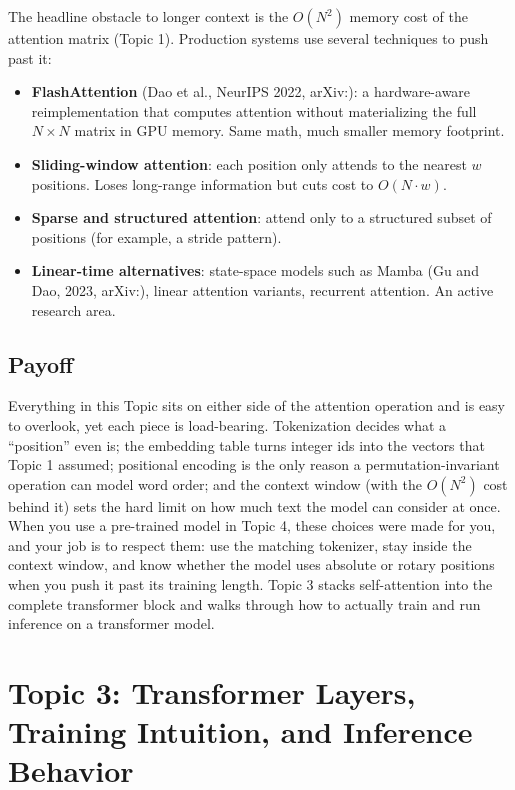 \documentclass[11pt]{article}
\theoremstyle{remark}
\newcommand{\arxiv}[1]{arXiv:\allowbreak #1}
\begin{document}
The headline obstacle to longer context is the \(O(N^2)\) memory cost of the attention matrix (Topic 1). Production systems use several techniques to push past it:
\begin{itemize}[noitemsep]
    \item \textbf{FlashAttention} (Dao et al., NeurIPS 2022, \arxiv{2205.14135}): a hardware-aware reimplementation that computes attention without materializing the full \(N \times N\) matrix in GPU memory. Same math, much smaller memory footprint.
    \item \textbf{Sliding-window attention}: each position only attends to the nearest \(w\) positions. Loses long-range information but cuts cost to \(O(N \cdot w)\).
    \item \textbf{Sparse and structured attention}: attend only to a structured subset of positions (for example, a stride pattern).
    \item \textbf{Linear-time alternatives}: state-space models such as Mamba (Gu and Dao, 2023, \arxiv{2312.00752}), linear attention variants, recurrent attention. An active research area.
\end{itemize}

\subsection{Payoff}

Everything in this Topic sits on either side of the attention operation and is easy to overlook, yet each piece is load-bearing. Tokenization decides what a ``position'' even is; the embedding table turns integer ids into the vectors that Topic 1 assumed; positional encoding is the only reason a permutation-invariant operation can model word order; and the context window (with the \(O(N^2)\) cost behind it) sets the hard limit on how much text the model can consider at once. When you use a pre-trained model in Topic 4, these choices were made for you, and your job is to respect them: use the matching tokenizer, stay inside the context window, and know whether the model uses absolute or rotary positions when you push it past its training length. Topic 3 stacks self-attention into the complete transformer block and walks through how to actually train and run inference on a transformer model.

\clearpage
%
\section{Topic 3: Transformer Layers, Training Intuition, and Inference Behavior}
%
\end{document}
